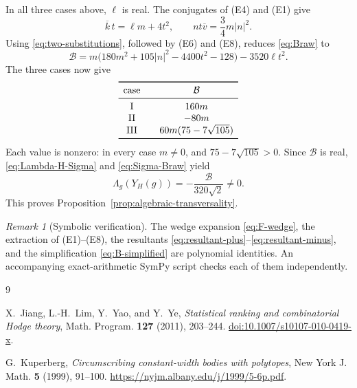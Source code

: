 \documentclass[11pt,reqno]{amsart}
\theoremstyle{remark}
\newtheorem{remark}[theorem]{Remark}
\newcommand{\abs}[1]{\left\lvert #1\right\rvert}
\begin{document}
In all three cases above, $\ell$ is real.  The conjugates of (E4) and (E1)
give
\begin{equation}\label{eq:two-substitutions}
\overline k\,t=\ell m+4t^2,
\qquad
nt\overline v=\frac34m\abs n^2.
\end{equation}
Using \eqref{eq:two-substitutions}, followed by (E6) and (E8), reduces
\eqref{eq:Braw} to
\begin{equation}\label{eq:B-simplified}
\mathcal B
=m\bigl(180m^2+105\abs n^2-4400t^2-128\bigr)
-3520\ell t^2.
\end{equation}
The three cases now give
\begin{equation}\label{eq:B-values}
\begin{array}{c@{\qquad}c}
\toprule
\text{case}&\mathcal B\\
\midrule
\mathrm{I}&160m\\
\mathrm{II}&-80m\\
\mathrm{III}&60m(75-7\sqrt{105})\\
\bottomrule
\end{array}
\end{equation}
Each value is nonzero: in every case $m\ne0$, and
$75-7\sqrt{105}>0$.  Since $\mathcal B$ is real,
\eqref{eq:Lambda-H-Sigma} and \eqref{eq:Sigma-Braw} yield
\[
\Lambda_g(Y_H(g))=-\frac{\mathcal B}{320\sqrt2}\ne0.
\]
This proves Proposition~\ref{prop:algebraic-transversality}.

\begin{remark}[Symbolic verification]
The wedge expansion \eqref{eq:F-wedge}, the extraction of (E1)--(E8), the
resultants \eqref{eq:resultant-plus}--\eqref{eq:resultant-minus}, and the
simplification \eqref{eq:B-simplified} are polynomial identities.  An
accompanying exact-arithmetic SymPy script checks each of them independently.
\end{remark}


\begin{thebibliography}{9}

X.~Jiang, L.-H.~Lim, Y.~Yao, and Y.~Ye,
\emph{Statistical ranking and combinatorial Hodge theory},
Math. Program. \textbf{127} (2011), 203--244.
\href{https://doi.org/10.1007/s10107-010-0419-x}{doi:10.1007/s10107-010-0419-x}.

G.~Kuperberg,
\emph{Circumscribing constant-width bodies with polytopes},
New York J. Math. \textbf{5} (1999), 91--100.
\url{https://nyjm.albany.edu/j/1999/5-6p.pdf}.

\end{thebibliography}
\end{document}
